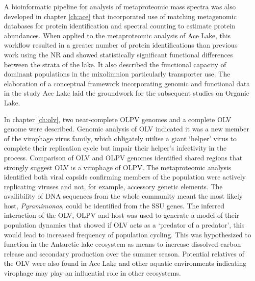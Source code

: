 A bioinformatic pipeline for analysis of metaproteomic mass spectra was also developed in chapter \ref{ch:ace} that incorporated use of matching metagenomic databases for protein identification and spectral counting to estimate protein abundances.
When applied to the metaproteomic analysis of Ace Lake, this workflow resulted in a greater number of protein identifications than previous work using the \ac{NR} and showed statistically significant functional differences between the strata of the lake.
It also described the functional capacity of dominant populations in the mixolimnion particularly transporter use.
The elaboration of a conceptual framework incorporating genomic and functional data in the study Ace Lake laid the groundwork for the subsequent studies on Organic Lake.

In chapter \ref{ch:olv}, two near-complete \ac{OLPV} genomes and a complete \ac{OLV} genome were described.
Genomic analysis of \ac{OLV} indicated it was a new member of the virophage virus family, which obligately utilise a  giant `helper' virus to complete their replication cycle but impair their helper's infectivity in the process.
Comparison of \ac{OLV} and \ac{OLPV} genomes identified shared regions that strongly suggest \ac{OLV} is a virophage of \ac{OLPV}.
The metaproteomic analysis identified both viral capsids confirming members of the population were actively replicating viruses and not, for example, accessory genetic elements.
The availibility of \textsc{DNA} sequences from the whole community meant the most likely host, \emph{Pyramimonas}, could be identified from the \ac{SSU} genes.
The inferred interaction of the \ac{OLV}, \ac{OLPV} and host was used to generate a model of their population dynamics that showed if \ac{OLV} acts as a `predator of a predator', this would lead to increased frequency of population cycling.
This was hypothesized to function in the Antarctic lake ecosystem as means to increase dissolved carbon release and secondary production over the summer season.
Potential relatives of the \ac{OLV} were also found in Ace Lake and other aquatic environments indicating virophage may play an influential role in other ecosystems.

